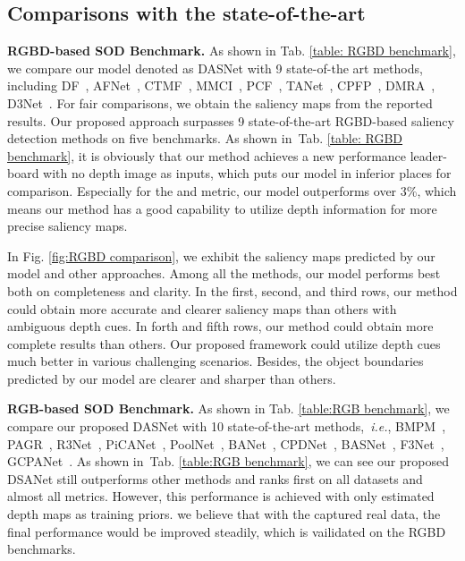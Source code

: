 \documentclass[sigconf]{acmart}
\def\ie{{\em i.e.}}
\newcommand{\figref}[1]{Fig. \ref{#1}}
\newcommand{\tabref}[1]{Tab. \ref{#1}}
\begin{document}
\subsection{Comparisons with the state-of-the-art}

\textbf{RGBD-based SOD Benchmark.} As shown in \tabref{table: RGBD benchmark}, we compare our model denoted as DASNet with 9 state-of-the art methods, including DF~\cite{qu2017rgbd}, AFNet~\cite{wang2019adaptive}, CTMF~\cite{han2017cnns}, MMCI~\cite{chen2019multi}, PCF~\cite{chen2018progressively}, TANet~\cite{chen2019three}, CPFP~\cite{zhao2019contrast}, DMRA~\cite{piao2019depth}, D3Net~\cite{fan2019D3Net}. For  fair comparisons, we obtain the saliency maps from the reported results. Our proposed approach surpasses 9 state-of-the-art RGBD-based saliency detection methods on five benchmarks. As shown in~\tabref{table: RGBD benchmark}, it is obviously that our method achieves a new performance leader-board with no depth image as inputs, which puts our model in inferior places for comparison.
Especially for the  and  metric, our model outperforms over 3\%, which means our method has a good capability to utilize depth information for more precise saliency maps.

In \figref{fig:RGBD comparison}, we exhibit the saliency maps predicted by our model and other approaches. Among all the methods, our model performs best both on completeness and clarity. In the first, second, and third rows, our method could obtain more accurate and clearer saliency maps than others with ambiguous depth cues. In forth and fifth rows, our method could obtain more complete results than others. Our proposed framework could utilize depth cues much better in various challenging scenarios. Besides, the object boundaries predicted by our model are clearer and sharper than others.


\textbf{RGB-based SOD Benchmark.} As shown in \tabref{table:RGB benchmark}, we compare our proposed DASNet with 10 state-of-the-art methods,~\ie, BMPM~\cite{zhang2018bi}, PAGR~\cite{zhang2018progressive}, R3Net~\cite{deng2018r3net}, PiCANet~\cite{liu2018picanet}, PoolNet~\cite{liu2019simple}, BANet~\cite{su2019selectivity}, CPDNet~\cite{wu2019cascaded}, BASNet~\cite{qin2019basnet}, F3Net~\cite{F3Net}, GCPANet~\cite{chen2020global}.
As shown in~\tabref{table:RGB benchmark}, we can see our proposed DSANet still outperforms other methods and ranks first on all datasets and almost all metrics. However, this performance is achieved with only estimated depth maps as training priors. we believe that with the captured real data, the final performance would be improved steadily, which is vailidated on the RGBD benchmarks.
\end{document}
